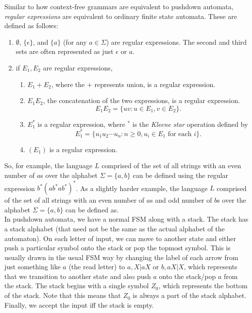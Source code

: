 
Similar to how context-free grammars are equivalent to pushdown automata, \emph{regular expressions} are equivalent to ordinary finite state automata. These are defined as follows:
\begin{enumerate}
	\item $\emptyset$, $\{\epsilon\}$, and $\{a\}$ (for any $a\in\Sigma$) are regular expressions. The second and third sets are often represented as just $\epsilon$ or $a$.
	\item if $E_1, E_2$ are regular expressions,
	\begin{enumerate}
		\item $E_1 + E_2$, where the $+$ represents union, is a regular expression.
		\item $E_1 E_2$, the concatenation of the two expressions, is a regular expression.
		\[ E_1 E_2 = \{ uv : u \in E_1, v \in E_2 \}. \]
		\item $E_1^*$ is a regular expression, where $^*$ is the \emph{Kleene star} operation defined by
		\[ E_1^* = \{u_1u_2\cdots u_n : n \ge 0, u_i \in E_1\text{ for each }i \}. \]
		\item $(E_1)$ is a regular expression.
	\end{enumerate}
\end{enumerate}

So, for example, the language $L$ comprised of the set of all strings with an even number of $a$s over the alphabet $\Sigma = \{a,b\}$ can be defined using the regular expression $b^*(ab^*ab^*)^*$.
As a slightly harder example, the language $L$ comprised of the set of all strings with an even number of $a$s and odd number of $b$s over the alphabet $\Sigma = \{a,b\}$ can be defined as.\\

In pushdown automata, we have a normal FSM along with a stack. The stack has a stack alphabet (that need not be the same as the actual alphabet of the automaton). On each letter of input, we can move to another state and either push a particular symbol onto the stack or pop the topmost symbol. This is usually drawn in the usual FSM way by changing the label of each arrow from just something like $a$ (the read letter) to $a, X | aX$ or $b, aX | X$, which represents that we transition to another state and also push $a$ onto the stack/pop $a$ from the stack. The stack begins with a single symbol $Z_0$, which represents the bottom of the stack. Note that this means that $Z_0$ is always a part of the stack alphabet. Finally, we accept the input iff the stack is empty.